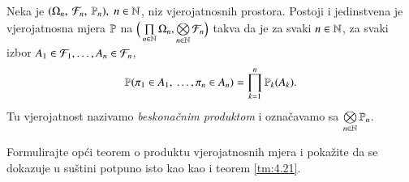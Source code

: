 \begin{tm}  \label{tm:4.21}
    Neka je $(\Omega_n, \: \mathcal{F}_n, \: \mathbb{P}_n), \; n \in \mathbb{N}$, niz vjerojatnosnih prostora.
    Postoji i jedinstvena je vjerojatnosna mjera $\mathbb{P}$ na $\Big( \prod\limits_{n \in \mathbb{N}}^{} \Omega_n, \bigotimes\limits_{n \in \mathbb{N}}^{} \mathcal{F}_n \Big)$ takva da je za svaki $n \in \mathbb{N}$, za svaki izbor $A_1 \in \mathcal{F}_1, \dots, A_n \in \mathcal{F}_n$,
    \begin{equation*}
        \mathbb{P}(\pi_1 \in A_1, \: \dots, \pi_n \in A_n)
        = \prod\limits_{k = 1}^{n} \mathbb{P}_k (A_k).
    \end{equation*}
    Tu vjerojatnost nazivamo \emph{beskona\v cnim produktom} i ozna\v cavamo sa $\bigotimes\limits_{n \in \mathbb{N}}^{} \mathbb{P}_n$.
\end{tm}

\begin{zad} \label{zad:4.22}
    Formulirajte op\' ci teorem o produktu vjerojatnosnih mjera i poka\v zite da se dokazuje u su\v stini potpuno isto kao kao i teorem \ref{tm:4.21}.
\end{zad}